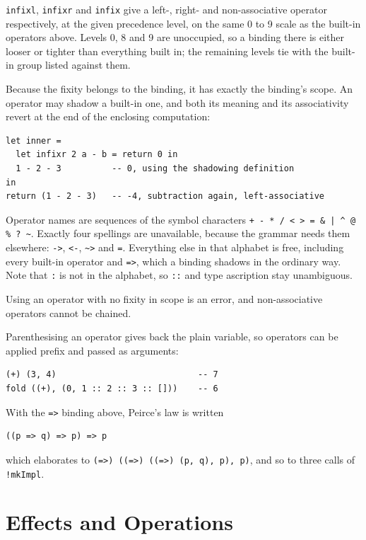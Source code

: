 \documentclass[11pt,a4paper]{article}
\newcommand{\cba}[1]{\lstinline[style=cbainline]{#1}}
\begin{document}
\cba{infixl}, \cba{infixr} and \cba{infix} give a left-, right- and
non-associative operator respectively, at the given precedence level, on the
same 0 to 9 scale as the built-in operators above.  Levels 0, 8 and 9 are
unoccupied, so a binding there is either looser or tighter than everything
built in; the remaining levels tie with the built-in group listed against
them.

Because the fixity belongs to the binding, it has exactly the binding's
scope.  An operator may shadow a built-in one, and both its meaning and its
associativity revert at the end of the enclosing computation:

\begin{lstlisting}
let inner =
  let infixr 2 a - b = return 0 in
  1 - 2 - 3          -- 0, using the shadowing definition
in
return (1 - 2 - 3)   -- -4, subtraction again, left-associative
\end{lstlisting}

Operator names are sequences of the symbol characters
\verb!+ - * / < > = & | ^ @ % ? ~!.  Exactly four spellings are unavailable,
because the grammar needs them elsewhere: \texttt{->}, \texttt{<-},
\texttt{\textasciitilde>} and \texttt{=}.  Everything else in that alphabet is
free, including every built-in operator and \texttt{=>}, which a binding
shadows in the ordinary way.  Note that \texttt{:} is not in the alphabet, so
\texttt{::} and type ascription stay unambiguous.

Using an operator with no fixity in scope is an error, and non-associative
operators cannot be chained.

Parenthesising an operator gives back the plain variable, so operators can be
applied prefix and passed as arguments:

\begin{lstlisting}
(+) (3, 4)                            -- 7
fold ((+), (0, 1 :: 2 :: 3 :: []))    -- 6
\end{lstlisting}

With the \texttt{=>} binding above, Peirce's law is written

\begin{lstlisting}
((p => q) => p) => p
\end{lstlisting}

which elaborates to
\cba{(=>) ((=>) ((=>) (p, q), p), p)}, and so to three calls of
\cba{!mkImpl}.

\section{Effects and Operations}
\label{sec:effects}
\end{document}
